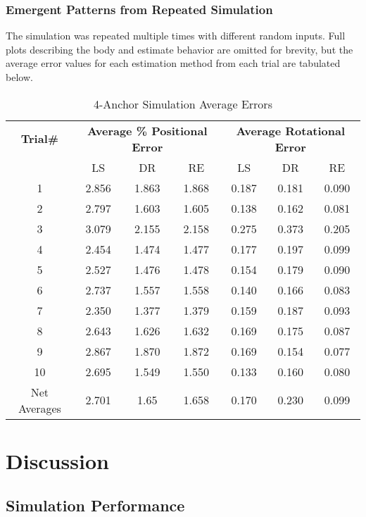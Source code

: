 \documentclass{report}
\begin{document}
			\subsection{Emergent Patterns from Repeated Simulation}
				The simulation was repeated multiple times with different random inputs. Full plots describing the body and estimate behavior are omitted for brevity, but the average error values for each estimation method from each trial are tabulated below.
				\begin{table}[H]
					\centering
					\label{tab:4a}
					\caption{4-Anchor Simulation Average Errors}
					\begin{tabular}{c c c c c c c}\toprule
						\textbf{Trial\#} & \multicolumn{3}{c}{\textbf{Average \% Positional Error}} & \multicolumn{3}{c}{\textbf{Average Rotational Error}} \\
						 & LS & DR & RE & LS & DR & RE \\\midrule
						1 & 2.856 & 1.863 & 1.868 & 0.187 & 0.181 & 0.090 \\
						2 & 2.797 & 1.603 & 1.605 & 0.138 & 0.162 & 0.081 \\
						3 & 3.079 & 2.155 & 2.158 & 0.275 & 0.373 & 0.205 \\
						4 & 2.454 & 1.474 & 1.477 & 0.177 & 0.197 & 0.099 \\
						5 & 2.527 & 1.476 & 1.478 & 0.154 & 0.179 & 0.090 \\
						6 & 2.737 & 1.557 & 1.558 & 0.140 & 0.166 & 0.083 \\
						7 & 2.350 & 1.377 & 1.379 & 0.159 & 0.187 & 0.093 \\
						8 & 2.643 & 1.626 & 1.632 & 0.169 & 0.175 & 0.087 \\
						9 & 2.867 & 1.870 & 1.872 & 0.169 & 0.154 & 0.077 \\
						10 & 2.695 & 1.549 & 1.550 & 0.133 & 0.160 & 0.080 \\\midrule
						Net Averages & 2.701 & 1.65 & 1.658 & 0.170 & 0.230 & 0.099 \\\bottomrule
					\end{tabular}
				\end{table}
	\chapter{Discussion}
		\section{Simulation Performance} \label{performance}
\end{document}
